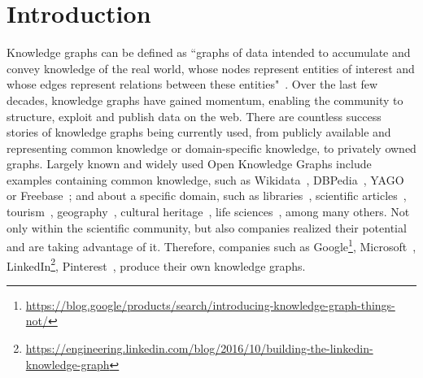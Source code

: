 \chapter{Introduction}
\label{chapter:intro}




Knowledge graphs can be defined as ``graphs of data intended to accumulate and convey knowledge of the real world, whose nodes represent entities of interest and whose edges represent relations between these entities"~\cite{hogan2021kg}. 
Over the last few decades, knowledge graphs have gained momentum, enabling the community to structure, exploit and publish data on the web. 
There are countless success stories of knowledge graphs being currently used, from publicly available and representing common knowledge or domain-specific knowledge, to privately owned graphs. 
Largely known and widely used Open Knowledge Graphs include examples containing common knowledge, such as Wikidata~\citep{erxleben2014introducing}, DBPedia~\citep{lehmann2015dbpedia}, YAGO~\citep{pellissier2020yago} or Freebase~\citep{bollacker2007freebase}; 
and about a specific domain, such as 
libraries~\citep{vila2013datos}, 
scientific articles~\citep{stocker2023orkg}, 
tourism~\citep{karle2018building,alonso2018rioja}, 
geography~\citep{stadler2012linkedgeodata}, 
cultural heritage~\citep{carriero2019arco}, 
life sciences~\citep{dumontier2014bio2rdf,pinero2020disgenet}, among many others. 
Not only within the scientific community, but also companies realized their potential and are taking advantage of it. Therefore, companies such as
Google\footnote{\url{https://blog.google/products/search/introducing-knowledge-graph-things-not/}},
Microsoft~\citep{farber2019microsoft},
LinkedIn\footnote{\url{https://engineering.linkedin.com/blog/2016/10/building-the-linkedin-knowledge-graph}}, 
Pinterest~\citep{goncalves2019pinterest},
produce their own knowledge graphs. 


